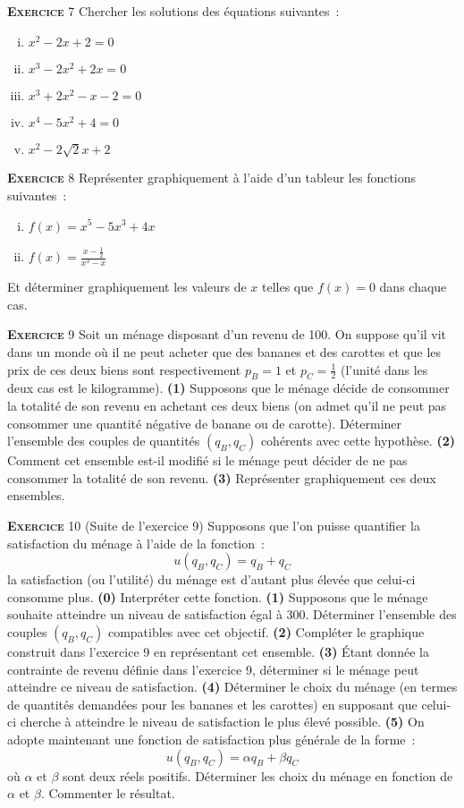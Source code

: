 \documentclass[10pt,a4paper,notitlepage]{article}
\newcommand{\exercice}[1]{\textsc{\textbf{Exercice}} #1}
\begin{document}
\bigskip

\exercice{7} Chercher les solutions des équations suivantes :
\begin{enumerate}[(i)]
\item $x^2-2x+2 = 0$
\item $x^3-2x^2+2x = 0$
\item $x^3+2x^2-x-2 = 0$
\item $x^4-5x^2+4 = 0$
\item $x^2 - 2\sqrt{2}x + 2$
\end{enumerate}

\bigskip

\exercice{8} Représenter graphiquement à l'aide d'un tableur les
fonctions suivantes :
\begin{enumerate}[(i)]
\item $f(x) = x^5- 5x^3 + 4x$
\item $f(x) = \frac{x-\frac{1}{2}}{x^3-x}$
\end{enumerate}
Et déterminer graphiquement les valeurs de $x$ telles que $f(x)=0$
dans chaque cas.

\bigskip

\exercice{9} Soit un ménage disposant d'un revenu de 100. On suppose
qu'il vit dans un monde où il ne peut acheter que des bananes et des
carottes et que les prix de ces deux biens sont respectivement $p_B=
1$ et $p_C = \frac{1}{2}$ (l'unité dans les deux cas est le
kilogramme). \textbf{(1)} Supposons que le ménage décide de consommer
la totalité de son revenu en achetant ces deux biens (on admet qu'il
ne peut pas consommer une quantité négative de banane ou de
carotte). Déterminer l'ensemble des couples de quantités $(q_B, q_C)$
cohérents avec cette hypothèse. \textbf{(2)} Comment cet ensemble est-il
modifié si le ménage peut décider de ne pas consommer la totalité de
son revenu. \textbf{(3)} Représenter graphiquement ces deux ensembles.

\bigskip

\exercice{10} (Suite de l'exercice 9) Supposons que l'on puisse
quantifier la satisfaction du ménage à l'aide de la fonction :
\[
u(q_B, q_C) = q_B + q_C
\]
la satisfaction (ou l'utilité) du ménage est d'autant plus élevée que
celui-ci consomme plus. \textbf{(0)} Interpréter cette
fonction. \textbf{(1)} Supposons que le ménage souhaite atteindre un
niveau de satisfaction égal à 300. Déterminer l'ensemble des couples
$(q_B, q_C)$ compatibles avec cet objectif. \textbf{(2)} Compléter le
graphique construit dans l'exercice 9 en représentant cet ensemble.
\textbf{(3)} Étant donnée la contrainte de revenu définie dans
l'exercice 9, déterminer si le ménage peut atteindre ce niveau de
satisfaction. \textbf{(4)} Déterminer le choix du ménage (en termes de
quantités demandées pour les bananes et les carottes) en supposant que
celui-ci cherche à atteindre le niveau de satisfaction le plus élevé
possible. \textbf{(5)} On adopte maintenant une fonction de
satisfaction plus générale de la forme :
\[
u(q_B, q_C) = \alpha q_B + \beta q_C
\]
où $\alpha$ et $\beta$ sont deux réels positifs. Déterminer les choix
du ménage en fonction de $\alpha$ et $\beta$. Commenter le résultat.
\end{document}
